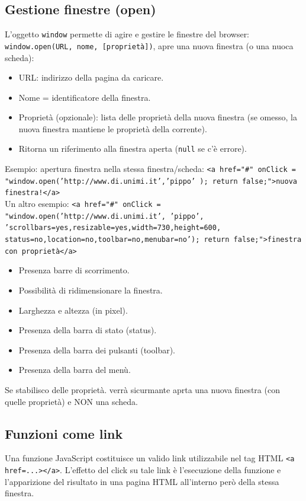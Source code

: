 \documentclass{article}
\begin{document}
\subsection{Gestione finestre (open)}
L'oggetto \texttt{window} permette di agire e gestire le finestre del browser: \texttt{window.open(URL, nome, [proprietà])}, apre una nuova finestra
(o una nuoca scheda):
\begin{itemize}
    \item URL: indirizzo della pagina da caricare.
    \item Nome = identificatore della finestra.
    \item Proprietà (opzionale): lista delle proprietà della nuova finestra (se omesso, la nuova finestra mantiene le proprietà della corrente).
    \item Ritorna un riferimento alla finestra aperta (\texttt{null} se c'è errore).
\end{itemize}
Esempio: apertura finestra nella stessa finestra/scheda: \texttt{<a href="\#" onClick = "window.open('http://www.di.unimi.it','pippo' ); return false;">nuova finestra!</a>}
\\ Un altro esempio: \texttt{<a href="\#" onClick = "window.open('http://www.di.unimi.it', 'pippo',
    'scrollbars=yes,resizable=yes,width=730,height=600,
    status=no,location=no,toolbar=no,menubar=no'); return
    false;">finestra con proprietà</a>}
\begin{itemize}
    \item Presenza barre di scorrimento.
    \item Possibilità di ridimensionare la finestra.
    \item Larghezza e altezza (in pixel).
    \item Presenza della barra di stato (status).
    \item Presenza della barra dei pulsanti (toolbar).
    \item Presenza della barra del menù.
\end{itemize}
Se stabilisco delle proprietà. verrà sicurmante aprta una nuova finestra (con quelle proprietà) e NON una scheda.
\subsection{Funzioni come link}
Una funzione JavaScript costituisce un valido link utilizzabile nel tag HTML \texttt{<a href=...></a>}. L'effetto del click su tale link è l'esecuzione della funzione e l'apparizione
del risultato in una pagina HTML all'interno però della stessa finestra.
\end{document}
